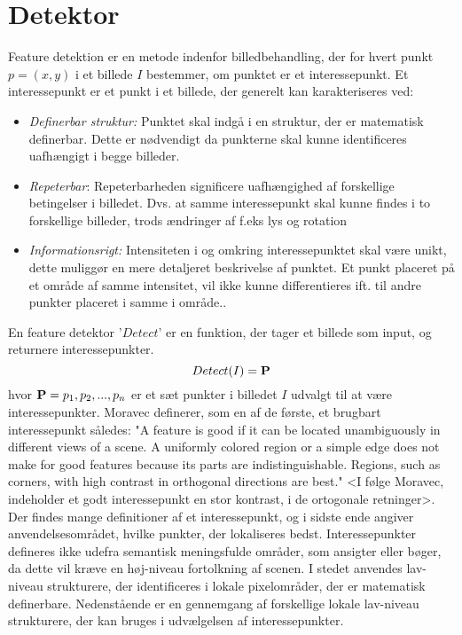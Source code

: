 \section{Detektor}\label{sec:detect}
Feature detektion er en metode indenfor billedbehandling, der for hvert punkt $p = (x,y)$ i et billede $I$ bestemmer, om punktet er et interessepunkt. Et interessepunkt er et punkt i et billede, der generelt kan karakteriseres ved\cite{pointsurvey}:
\begin{itemize}
\item{\textit{Definerbar struktur:} Punktet skal indgå i en struktur, der er matematisk definerbar. Dette er nødvendigt da punkterne skal kunne identificeres uafhængigt i begge billeder.}
\item{\emph{Repeterbar}: Repeterbarheden significere uafhængighed af forskellige betingelser i billedet. Dvs. at samme interessepunkt skal kunne findes i to forskellige billeder, trods ændringer af f.eks lys og rotation}
\item{\emph{Informationsrigt:}
Intensiteten i og omkring interessepunktet skal være unikt, dette muliggør en mere detaljeret beskrivelse af punktet. Et punkt placeret på et område af samme intensitet, vil ikke kunne differentieres ift. til andre punkter placeret i samme i område..}
\end{itemize}
En feature detektor '$Detect$' er en funktion, der tager et billede som input, og returnere interessepunkter.
\begin{equation}
Detect(I)= \bold{P}
\label{detect}
\end{equation}
hvor $\bold{P} = {p_1, p_2,..., p_n}$ er et sæt punkter i billedet $I$ udvalgt til at være interessepunkter.
Moravec \cite{moravec} definerer, som en af de første, et brugbart interessepunkt således: "A
feature is good if it can be located unambiguously in different views of a scene. A
uniformly colored region or a simple edge does not make for good features because
its parts are indistinguishable. Regions, such as corners, with high contrast in
orthogonal directions are best." <I følge Moravec, indeholder et godt interessepunkt en stor kontrast, i de ortogonale retninger>. Der findes mange definitioner af et interessepunkt, og i sidste ende angiver anvendelsesområdet, hvilke punkter, der lokaliseres bedst.
Interessepunkter defineres ikke udefra semantisk meningsfulde områder, som ansigter eller bøger, da dette vil kræve en høj-niveau fortolkning af scenen. I stedet anvendes lav-niveau strukturere, der identificeres i lokale pixelområder, der er matematisk definerbare. Nedenstående er en gennemgang af forskellige lokale lav-niveau strukturere, der kan bruges i udvælgelsen af interessepunkter.



\raggedbottom